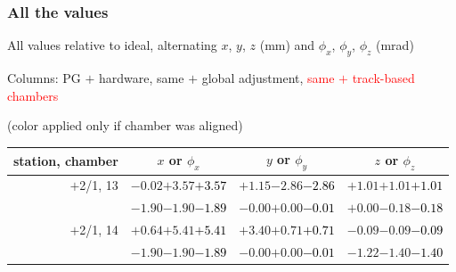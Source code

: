 \documentclass[compress]{beamer}
\begin{document}
\begin{frame}
\frametitle{All the values}
\tiny

All values relative to ideal, alternating $x$, $y$, $z$ (mm) and $\phi_x$, $\phi_y$, $\phi_z$ (mrad)

Columns: PG $+$ hardware, same $+$ global adjustment, \textcolor{red}{same $+$ track-based chambers}

\hfill (color applied only if chamber was aligned)

\vfill
\renewcommand{\arraystretch}{1.1}
\begin{tabular}{r | c | c | c}
station, chamber & $x$ or $\phi_x$ & $y$ or $\phi_y$ & $z$ or $\phi_z$ \\\hline
$+$2/1, 13 & $-0.02$\hspace{0.1 cm}$+3.57$\hspace{0.1 cm}\textcolor{black}{$+3.57$} & $+1.15$\hspace{0.1 cm}$-2.86$\hspace{0.1 cm}\textcolor{black}{$-2.86$} & $+1.01$\hspace{0.1 cm}$+1.01$\hspace{0.1 cm}\textcolor{black}{$+1.01$} \\
           & $-1.90$\hspace{0.1 cm}$-1.90$\hspace{0.1 cm}\textcolor{black}{$-1.89$} & $-0.00$\hspace{0.1 cm}$+0.00$\hspace{0.1 cm}\textcolor{black}{$-0.01$} & $+0.00$\hspace{0.1 cm}$-0.18$\hspace{0.1 cm}\textcolor{black}{$-0.18$} \\
$+$2/1, 14 & $+0.64$\hspace{0.1 cm}$+5.41$\hspace{0.1 cm}\textcolor{black}{$+5.41$} & $+3.40$\hspace{0.1 cm}$+0.71$\hspace{0.1 cm}\textcolor{black}{$+0.71$} & $-0.09$\hspace{0.1 cm}$-0.09$\hspace{0.1 cm}\textcolor{black}{$-0.09$} \\
           & $-1.90$\hspace{0.1 cm}$-1.90$\hspace{0.1 cm}\textcolor{black}{$-1.89$} & $-0.00$\hspace{0.1 cm}$+0.00$\hspace{0.1 cm}\textcolor{black}{$-0.01$} & $-1.22$\hspace{0.1 cm}$-1.40$\hspace{0.1 cm}\textcolor{black}{$-1.40$} \\

\end{tabular}
\end{frame}
\end{document}
